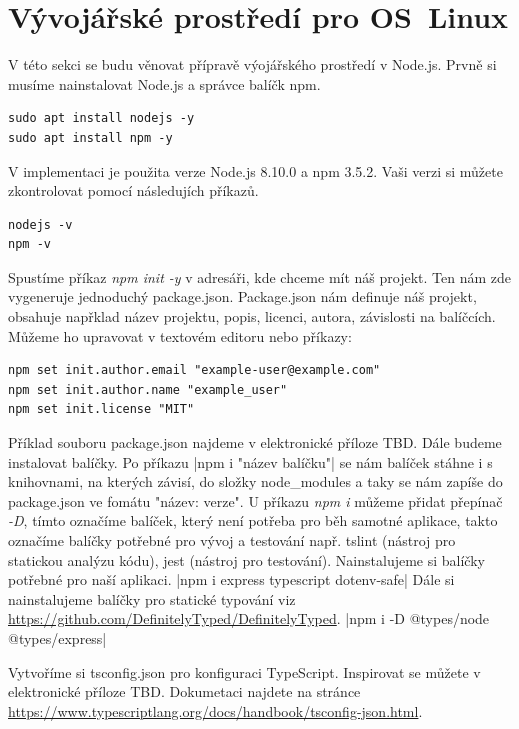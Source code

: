 \documentclass[thesis=B,czech]{FITthesis}[2012/06/26]
\begin{document}
    \section{Vývojářské prostředí pro OS~Linux}
        V této sekci se budu věnovat přípravě výojářského prostředí v Node.js.
        Prvně si musíme nainstalovat Node.js a správce balíčk npm.
        \begin{verbatim}
sudo apt install nodejs -y
sudo apt install npm -y
    \end{verbatim}
        V implementaci je použita verze Node.js 8.10.0 a npm 3.5.2. Vaši verzi si můžete zkontrolovat pomocí následujích příkazů.
        \begin{verbatim}
nodejs -v
npm -v
        \end{verbatim}
        Spustíme příkaz \textit{npm init -y} v adresáři, kde chceme mít náš projekt. Ten nám zde vygeneruje jednoduchý package.json. Package.json nám definuje náš projekt, obsahuje napřklad název projektu, popis, licenci, autora, závislosti na balíčcích. Můžeme ho upravovat v textovém editoru nebo příkazy:
        \begin{verbatim}
npm set init.author.email "example-user@example.com"
npm set init.author.name "example_user"
npm set init.license "MIT"
        \end{verbatim}
        Příklad souboru package.json najdeme v elektronické příloze TBD.
        Dále budeme instalovat balíčky. Po příkazu
        |npm i "název balíčku"|
        se nám balíček stáhne i s knihovnami, na kterých závisí, do složky node\_modules a taky se nám zapíše do package.json ve fomátu "název: verze". U příkazu \textit{npm i} můžeme přidat přepínač \textit{-D}, tímto označíme balíček, který není potřeba pro běh samotné aplikace, takto označíme balíčky potřebné pro vývoj a testování např. tslint (nástroj pro statickou analýzu kódu), jest (nástroj pro testování).
        Nainstalujeme si balíčky potřebné pro naší aplikaci.
        |npm i express typescript dotenv-safe|
        Dále si nainstalujeme balíčky pro statické typování viz \url{https://github.com/DefinitelyTyped/DefinitelyTyped}.
        |npm i -D @types/node @types/express|
    
        Vytvoříme si tsconfig.json pro konfiguraci TypeScript. Inspirovat se můžete v elektronické příloze TBD. Dokumetaci najdete na stránce \url{https://www.typescriptlang.org/docs/handbook/tsconfig-json.html}.
\end{document}

